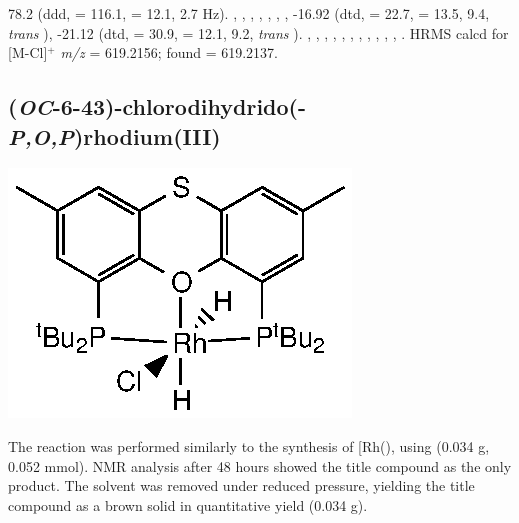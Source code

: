 78.2 (ddd, \JRhP{} = 116.1, \JPH{} = 12.1, 2.7 Hz).
,
,
,
,
,
,
,
-16.92 (dtd, \JRhH{} = 22.7, \JPH{} = 13.5, \JHH{} 9.4,  \emph{trans} ),
-21.12 (dtd, \JRhH{} = 30.9, \JPH{} = 12.1, \JHH{} 9.2,  \emph{trans} ).
,
,
,
,
,
,
,
,
,
,
,
.
HRMS calcd for  [M-Cl]$^+$ \emph{m/z} = 619.2156; found = 619.2137.



\subsection*{(\emph{OC}-6-43)-chlorodihydrido(\tButhixantphosk-\emph{P,O,P})rhodium(III)}

\begin{structure}[h]
\begin{center}
\includegraphics{../Structures/StBuRhClH2.eps}
\end{center}
\end{structure}

The reaction was performed similarly to the synthesis of [Rh(\tBusixantphos)\ce{Cl(H)2]}, using \tButhixantphos{} (0.034 g, 0.052 mmol).  NMR analysis after 48 hours showed the title compound as the only product.  The solvent was removed under reduced pressure, yielding the title compound as a brown solid in quantitative yield (0.034 g).  

